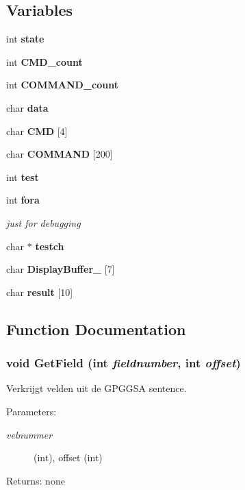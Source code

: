 \subsection*{Variables}
\begin{CompactItemize}
\item 
int {\bf state}
\item 
int {\bf CMD\_\-count}
\item 
int {\bf COMMAND\_\-count}
\item 
char {\bf data}
\item 
char {\bf CMD} [4]
\item 
char {\bf COMMAND} [200]
\item 
int {\bf test}
\item 
int {\bf fora}
\begin{CompactList}\small\item\em just for debugging \item\end{CompactList}\item 
char $\ast$ {\bf testch}
\item 
char {\bf DisplayBuffer\_} [7]
\item 
char {\bf result} [10]
\end{CompactItemize}


\subsection{Function Documentation}
\subsubsection{\setlength{\rightskip}{0pt plus 5cm}void GetField (int {\em fieldnumber}, int {\em offset})}\label{_n_m_e_a0183_parser_8h_9520f912aa8753453f8806988890c71a}


Verkrijgt velden uit de GPGGSA sentence. 

\begin{Desc}
\item[Parameters:]
\begin{description}
\item[{\em velnummer}](int), offset (int) \end{description}
\end{Desc}
\begin{Desc}
\item[Returns:]none \end{Desc}


